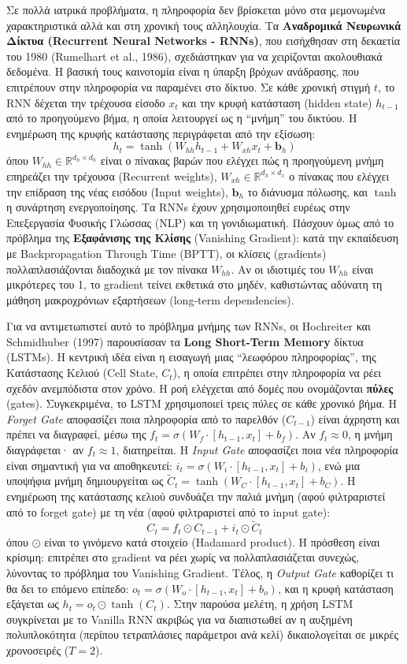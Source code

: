 Σε πολλά ιατρικά προβλήματα, η πληροφορία δεν βρίσκεται μόνο στα μεμονωμένα χαρακτηριστικά αλλά και στη χρονική τους αλληλουχία. Τα \textbf{Αναδρομικά Νευρωνικά Δίκτυα (Recurrent Neural Networks - RNNs)}, που εισήχθησαν στη δεκαετία του 1980 (Rumelhart et al., 1986), σχεδιάστηκαν για να χειρίζονται ακολουθιακά δεδομένα. Η βασική τους καινοτομία είναι η ύπαρξη βρόχων ανάδρασης, που επιτρέπουν στην πληροφορία να παραμένει στο δίκτυο. Σε κάθε χρονική στιγμή $t$, το RNN δέχεται την τρέχουσα είσοδο $x_t$ και την κρυφή κατάσταση (hidden state) $h_{t-1}$ από το προηγούμενο βήμα, η οποία λειτουργεί ως η ``μνήμη'' του δικτύου. Η ενημέρωση της κρυφής κατάστασης περιγράφεται από την εξίσωση:
$$h_t = \tanh(W_{hh} h_{t-1} + W_{xh} x_t + \mathbf{b}_h)$$
όπου $W_{hh} \in \mathbb{R}^{d_h \times d_h}$ είναι ο πίνακας βαρών που ελέγχει πώς η προηγούμενη μνήμη επηρεάζει την τρέχουσα (Recurrent weights), $W_{xh} \in \mathbb{R}^{d_h \times d_x}$ ο πίνακας που ελέγχει την επίδραση της νέας εισόδου (Input weights), $\mathbf{b}_h$ το διάνυσμα πόλωσης, και $\tanh$ η συνάρτηση ενεργοποίησης. Τα RNNs έχουν χρησιμοποιηθεί ευρέως στην Επεξεργασία Φυσικής Γλώσσας (NLP) και τη γονιδιωματική. Πάσχουν όμως από το πρόβλημα της \textbf{Εξαφάνισης της Κλίσης} (Vanishing Gradient): κατά την εκπαίδευση με Backpropagation Through Time (BPTT), οι κλίσεις (gradients) πολλαπλασιάζονται διαδοχικά με τον πίνακα $W_{hh}$. Αν οι ιδιοτιμές του $W_{hh}$ είναι μικρότερες του 1, το gradient τείνει εκθετικά στο μηδέν, καθιστώντας αδύνατη τη μάθηση μακροχρόνιων εξαρτήσεων (long-term dependencies).

Για να αντιμετωπιστεί αυτό το πρόβλημα μνήμης των RNNs, οι Hochreiter και Schmidhuber (1997) παρουσίασαν τα \textbf{Long Short-Term Memory} δίκτυα (LSTMs). Η κεντρική ιδέα είναι η εισαγωγή μιας ``λεωφόρου πληροφορίας'', της Κατάστασης Κελιού (Cell State, $C_t$), η οποία επιτρέπει στην πληροφορία να ρέει σχεδόν ανεμπόδιστα στον χρόνο. Η ροή ελέγχεται από δομές που ονομάζονται \textbf{πύλες} (gates). Συγκεκριμένα, το LSTM χρησιμοποιεί τρεις πύλες σε κάθε χρονικό βήμα. Η \emph{Forget Gate} αποφασίζει ποια πληροφορία από το παρελθόν ($C_{t-1}$) είναι άχρηστη και πρέπει να διαγραφεί, μέσω της $f_t = \sigma(W_f \cdot [h_{t-1}, x_t] + b_f)$. Αν $f_t \approx 0$, η μνήμη διαγράφεται· αν $f_t \approx 1$, διατηρείται. Η \emph{Input Gate} αποφασίζει ποια νέα πληροφορία είναι σημαντική για να αποθηκευτεί: $i_t = \sigma(W_i \cdot [h_{t-1}, x_t] + b_i)$, ενώ μια υποψήφια μνήμη δημιουργείται ως $\tilde{C}_t = \tanh(W_C \cdot [h_{t-1}, x_t] + b_C)$. Η ενημέρωση της κατάστασης κελιού συνδυάζει την παλιά μνήμη (αφού φιλτραριστεί από το forget gate) με τη νέα (αφού φιλτραριστεί από το input gate):
$$C_t = f_t \odot C_{t-1} + i_t \odot \tilde{C}_t$$
όπου $\odot$ είναι το γινόμενο κατά στοιχείο (Hadamard product). Η πρόσθεση είναι κρίσιμη: επιτρέπει στο gradient να ρέει χωρίς να πολλαπλασιάζεται συνεχώς, λύνοντας το πρόβλημα του Vanishing Gradient. Τέλος, η \emph{Output Gate} καθορίζει τι θα δει το επόμενο επίπεδο: $o_t = \sigma(W_o \cdot [h_{t-1}, x_t] + b_o)$, και η κρυφή κατάσταση εξάγεται ως $h_t = o_t \odot \tanh(C_t)$. Στην παρούσα μελέτη, η χρήση LSTM συγκρίνεται με το Vanilla RNN ακριβώς για να διαπιστωθεί αν η αυξημένη πολυπλοκότητα (περίπου τετραπλάσιες παράμετροι ανά κελί) δικαιολογείται σε μικρές χρονοσειρές ($T=2$).

